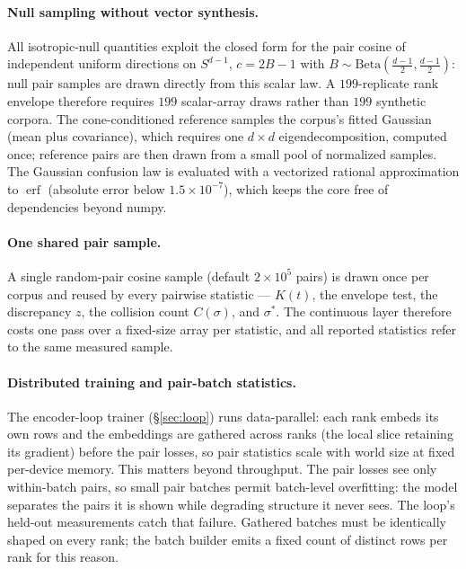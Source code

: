 \documentclass[11pt,letterpaper]{article}
\newcommand{\sstar}{\sigma^{*}}
\begin{document}
\paragraph{Null sampling without vector synthesis.}
All isotropic-null quantities exploit the closed form for the pair cosine
of independent uniform directions on $S^{d-1}$, $c = 2B - 1$ with $B \sim
\mathrm{Beta}\!\left(\tfrac{d-1}{2}, \tfrac{d-1}{2}\right)$: null pair
samples are drawn directly from this scalar law. A $199$-replicate rank
envelope therefore requires $199$ scalar-array draws rather than $199$
synthetic corpora. The cone-conditioned reference samples the corpus's fitted Gaussian
(mean plus covariance), which requires one $d \times d$
eigendecomposition, computed once; reference pairs are then drawn from a
small pool of normalized samples. The Gaussian confusion law is evaluated with a
vectorized rational approximation to $\operatorname{erf}$ (absolute error
below $1.5\times10^{-7}$), which keeps the core free of dependencies
beyond \textsf{numpy}.

\paragraph{One shared pair sample.}
A single random-pair cosine sample (default $2\times10^5$ pairs) is drawn
once per corpus and reused by every pairwise statistic --- $K(t)$, the
envelope test, the discrepancy $z$, the collision count $C(\sigma)$,
and $\sstar$. The continuous layer therefore costs one pass over a
fixed-size array per statistic, and all reported statistics refer to the
same measured sample.

\paragraph{Distributed training and pair-batch statistics.}
The encoder-loop trainer (\S\ref{sec:loop}) runs data-parallel: each rank
embeds its own rows and the embeddings are gathered across ranks (the
local slice retaining its gradient) before the pair losses, so pair
statistics scale with world size at fixed per-device memory. This matters
beyond throughput. The pair losses see only within-batch pairs, so small
pair batches permit batch-level overfitting: the model separates the pairs
it is shown while degrading structure it never sees. The loop's held-out
measurements catch that failure. Gathered batches must be identically
shaped on every rank; the batch builder emits a fixed count of distinct
rows per rank for this reason.
\end{document}
